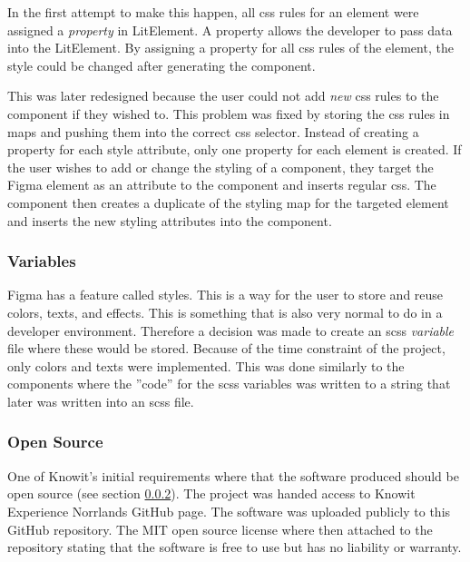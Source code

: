 In the first attempt to make this happen, all \acrshort{css} rules for an \gls{element} were assigned a \textit{property} in LitElement. A property allows the developer to pass data into the LitElement. By assigning a property for all \acrshort{css} rules of the \gls{element}, the style could be changed after generating the \gls{component}.

This was later redesigned because the user could not add \textit{new} \acrshort{css} rules to the component if they wished to. This problem was fixed by storing the \acrshort{css} rules in maps\cite{ArrayPrototypeMap} and pushing them into the correct \acrshort{css} selector. Instead of creating a property for each style attribute, only one property for each element is created. If the user wishes to add or change the styling of a component, they target the Figma element as an attribute to the component and inserts regular \acrshort{css}. The component then creates a duplicate of the styling map for the targeted element and inserts the new styling attributes into the component.


\subsubsection{Variables}%
\label{ssub:Variables}
Figma has a feature called styles. This is a way for the user to store and reuse colors, texts, and effects. This is something that is also very normal to do in a developer environment. Therefore a decision was made to create an \acrshort{scss} \textit{variable} file where these would be stored. Because of the time constraint of the project, only colors and texts were implemented. This was done similarly to the components where the ''code'' for the \acrshort{scss} variables was written to a string that later was written into an \acrshort{scss} file. 


\subsubsection{Open Source}%
\label{ssub:Open Source}
One of Knowit's initial requirements where that the software produced should be open source (see section \ref{ssub:Open Source}). The project was handed access to Knowit Experience Norrlands GitHub page. The software was uploaded publicly to this GitHub repository\cite{KnowitExperienceNorrlandFigmaConverter2021}. The MIT\cite{MITLicenseOpen} open source license where then attached to the repository stating that the software is free to use but has no liability or warranty.
 
